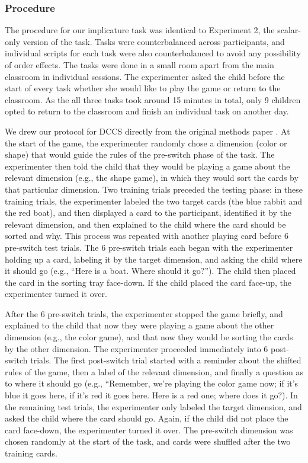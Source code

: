 \documentclass[man]{apa2}
\begin{document}
\subsubsection{Procedure}
The procedure for our implicature task was identical to Experiment 2, the scalar-only version of the task. Tasks were counterbalanced across participants, and individual scripts for each task were also counterbalanced to avoid any possibility of order effects. The tasks were done in a small room apart from the main classroom in individual sessions. The experimenter asked the child before the start of every task whether she would like to play the game or return to the classroom. As the all three tasks took around 15 minutes in total, only 9 children opted to return to the classroom and finish an individual task on another day. 

We drew our protocol for DCCS directly from the original methods paper \cite{zelazo2006}. At the start of the game, the experimenter randomly chose a dimension (color or shape) that would guide the rules of the pre-switch phase of the task. The experimenter then told the child that they would be playing a game about the relevant dimension (e.g., the shape game), in which they would sort the cards by that particular dimension. Two training trials preceded the testing phase: in these training trials, the experimenter labeled the two target cards (the blue rabbit and the red boat), and then displayed a card to the participant, identified it by the relevant dimension, and then explained to the child where the card should be sorted and why. This process was repeated with another playing card before 6 pre-switch test trials. The 6 pre-switch trials each began with the experimenter holding up a card, labeling it by the target dimension, and asking the child where it should go (e.g., ``Here is a boat. Where should it go?''). The child then placed the card in the sorting tray face-down. If the child placed the card face-up, the experimenter turned it over. 

After the 6 pre-switch trials, the experimenter stopped the game briefly, and explained to the child that now they were playing a game about the other dimension (e.g., the color game), and that now they would be sorting the cards by the other dimension. The experimenter proceeded immediately into 6 post-switch trials. The first post-switch trial started with a reminder about the shifted rules of the game, then a label of the relevant dimension, and finally a question as to where it should go (e.g., ``Remember, we're playing the color game now; if it's blue it goes here, if it's red it goes here. Here is a red one; where does it go?). In the remaining test trials, the experimenter only labeled the target dimension, and asked the child where the card should go. Again, if the child did not place the card face-down, the experimenter turned it over. The pre-switch dimension was chosen randomly at the start of the task, and cards were shuffled after the two training cards. 
\end{document}
